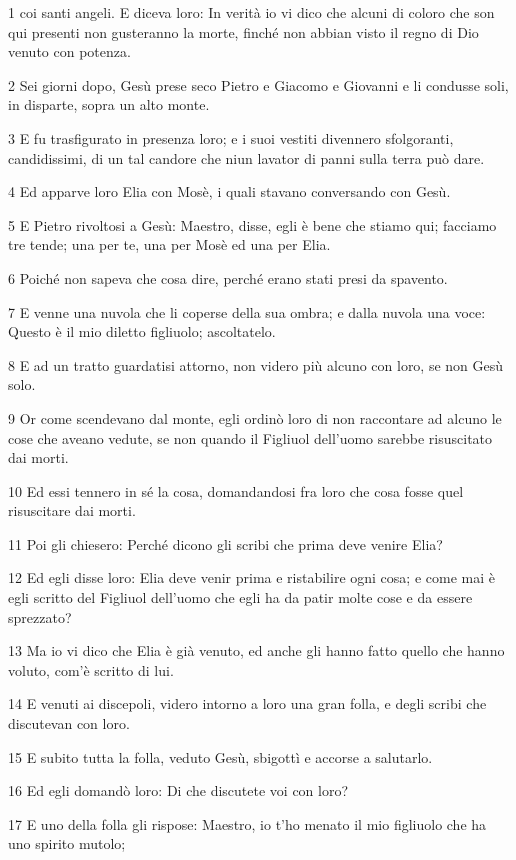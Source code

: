 \par 1 coi santi angeli. E diceva loro: In verità io vi dico che alcuni di coloro che son qui presenti non gusteranno la morte, finché non abbian visto il regno di Dio venuto con potenza.
\par 2 Sei giorni dopo, Gesù prese seco Pietro e Giacomo e Giovanni e li condusse soli, in disparte, sopra un alto monte.
\par 3 E fu trasfigurato in presenza loro; e i suoi vestiti divennero sfolgoranti, candidissimi, di un tal candore che niun lavator di panni sulla terra può dare.
\par 4 Ed apparve loro Elia con Mosè, i quali stavano conversando con Gesù.
\par 5 E Pietro rivoltosi a Gesù: Maestro, disse, egli è bene che stiamo qui; facciamo tre tende; una per te, una per Mosè ed una per Elia.
\par 6 Poiché non sapeva che cosa dire, perché erano stati presi da spavento.
\par 7 E venne una nuvola che li coperse della sua ombra; e dalla nuvola una voce: Questo è il mio diletto figliuolo; ascoltatelo.
\par 8 E ad un tratto guardatisi attorno, non videro più alcuno con loro, se non Gesù solo.
\par 9 Or come scendevano dal monte, egli ordinò loro di non raccontare ad alcuno le cose che aveano vedute, se non quando il Figliuol dell'uomo sarebbe risuscitato dai morti.
\par 10 Ed essi tennero in sé la cosa, domandandosi fra loro che cosa fosse quel risuscitare dai morti.
\par 11 Poi gli chiesero: Perché dicono gli scribi che prima deve venire Elia?
\par 12 Ed egli disse loro: Elia deve venir prima e ristabilire ogni cosa; e come mai è egli scritto del Figliuol dell'uomo che egli ha da patir molte cose e da essere sprezzato?
\par 13 Ma io vi dico che Elia è già venuto, ed anche gli hanno fatto quello che hanno voluto, com'è scritto di lui.
\par 14 E venuti ai discepoli, videro intorno a loro una gran folla, e degli scribi che discutevan con loro.
\par 15 E subito tutta la folla, veduto Gesù, sbigottì e accorse a salutarlo.
\par 16 Ed egli domandò loro: Di che discutete voi con loro?
\par 17 E uno della folla gli rispose: Maestro, io t'ho menato il mio figliuolo che ha uno spirito mutolo;
